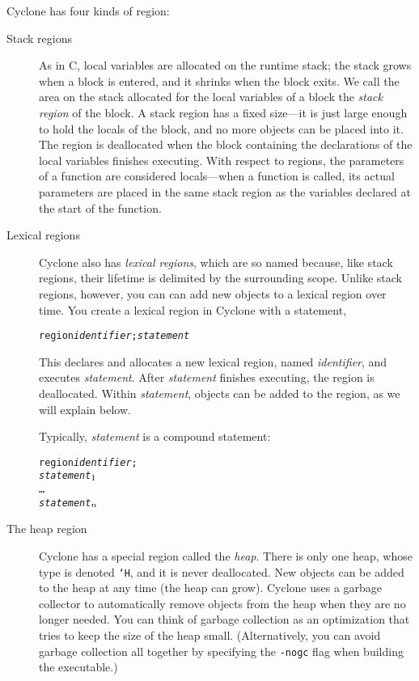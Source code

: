 Cyclone has four kinds of region:
\begin{description}
\item[Stack regions] As in C, local variables are allocated on the
  runtime stack; the stack grows when a block is entered, and it
  shrinks when the block exits.  We call the area on the stack
  allocated for the local variables of a block the \emph{stack region}
  of the block.  A stack region has a fixed size---it is just large
  enough to hold the locals of the block, and no more objects can be
  placed into it.  The region is deallocated when the block containing
  the declarations of the local variables finishes executing.  With
  respect to regions, the parameters of a function are considered
  locals---when a function is called, its actual parameters are placed
  in the same stack region as the variables declared at the start of
  the function.
  
\item[Lexical regions] Cyclone also has \emph{lexical regions}, which are so
  named because, like stack regions, their lifetime is delimited by the
  surrounding scope.  Unlike stack regions, however, you can can add new
  objects to a lexical region over time.  You create a lexical region in
  Cyclone with a statement,
\begin{alltt}
  region {\it identifier}; {\it statement}
\end{alltt}
  This declares and allocates a new lexical region, named
  \textit{identifier}, and executes \textit{statement}.  After
  \textit{statement} finishes executing, the region is deallocated.
  Within \textit{statement}, objects can be added to the region, as we
  will explain below.

  Typically, \textit{statement} is a compound statement:
\begin{alltt}
  \lb region \textit{identifier};
    {\it statement}\(\sb{1}\)
    \ldots
    {\it statement}\(\sb{n}\)
  \rb
\end{alltt}

\item[The heap region] Cyclone has a special region called the
  \emph{heap}. There is only one heap, whose type is denoted \texttt{`H},
  and it is never deallocated.  New objects can be added to the heap at any
  time (the heap can grow).  Cyclone uses a garbage collector to
  automatically remove objects from the heap when they are no longer needed.
  You can think of garbage collection as an optimization that tries to keep
  the size of the heap small.  (Alternatively, you can avoid garbage
  collection all together by specifying the \texttt{-nogc} flag when
  building the executable.)


\end{description}
